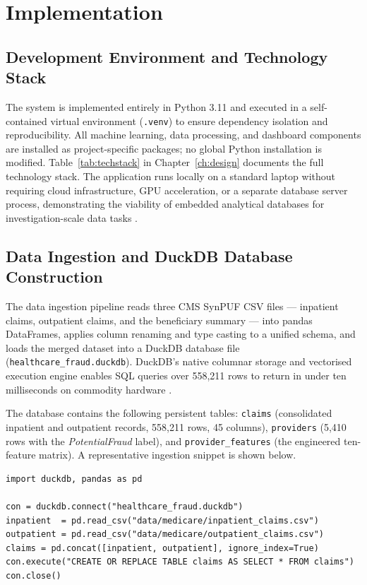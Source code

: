 \chapter{Implementation}
\label{ch:implementation}

\section{Development Environment and Technology Stack}

The system is implemented entirely in Python 3.11 and executed in a self-contained virtual environment (\texttt{.venv}) to ensure dependency isolation and reproducibility. All machine learning, data processing, and dashboard components are installed as project-specific packages; no global Python installation is modified. Table~\ref{tab:techstack} in Chapter~\ref{ch:design} documents the full technology stack. The application runs locally on a standard laptop without requiring cloud infrastructure, GPU acceleration, or a separate database server process, demonstrating the viability of embedded analytical databases for investigation-scale data tasks \cite{b18}.

\section{Data Ingestion and DuckDB Database Construction}
\label{sec:impl-ingest}

The data ingestion pipeline reads three CMS SynPUF CSV files --- inpatient claims, outpatient claims, and the beneficiary summary --- into pandas DataFrames, applies column renaming and type casting to a unified schema, and loads the merged dataset into a DuckDB database file (\texttt{healthcare\_fraud.duckdb}). DuckDB's native columnar storage and vectorised execution engine enables SQL queries over 558,211 rows to return in under ten milliseconds on commodity hardware \cite{b17}.

The database contains the following persistent tables: \texttt{claims} (consolidated inpatient and outpatient records, 558,211 rows, 45 columns), \texttt{providers} (5,410 rows with the \textit{PotentialFraud} label), and \texttt{provider\_features} (the engineered ten-feature matrix). A representative ingestion snippet is shown below.

\begin{lstlisting}
import duckdb, pandas as pd

con = duckdb.connect("healthcare_fraud.duckdb")
inpatient  = pd.read_csv("data/medicare/inpatient_claims.csv")
outpatient = pd.read_csv("data/medicare/outpatient_claims.csv")
claims = pd.concat([inpatient, outpatient], ignore_index=True)
con.execute("CREATE OR REPLACE TABLE claims AS SELECT * FROM claims")
con.close()
\end{lstlisting}

